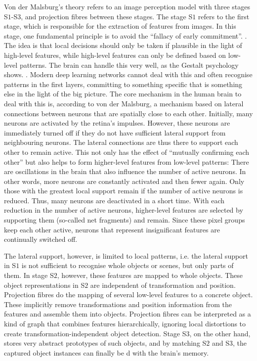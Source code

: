 Von der Malsburg's theory refers to an image perception model with three stages S$1$-S$3$, and projection fibres between these stages.
The stage S$1$ refers to the first stage, which is responsible for the extraction of features from images. In this stage, one fundamental principle is to avoid the ``fallacy of early commitment''. .
The idea is that local decisions should only be taken if plausible in the light of high-level features, while high-level features can only be defined based on low-level patterns.
The brain can handle this very well, as the Gestalt psychology shows. .
Modern deep learning networks cannot deal with this and often recognise patterns in the first layers, committing to something specific that is something else in the light of the big picture. The core mechanism in the human brain to deal with this is, according to von der Malsburg, a mechanism based on lateral connections between neurons that are spatially close to each other. Initially, many neurons are activated by the retina's impulses. However, these neurons are immediately turned off if they do not have sufficient lateral support from neighbouring neurons. The lateral connections are thus there to support each other to remain active. This not only has the effect of ``mutually confirming each other'' but also helps to form higher-level features from low-level patterns: There are oscillations in the brain that also influence the number of active neurons. In other words, more neurons are constantly activated and then fewer again. Only those with the greatest local support remain if the number of active neurons is reduced. Thus, many neurons are deactivated in a short time. With each reduction in the number of active neurons, higher-level features are selected by supporting them (so-called net fragments) and remain.
Since these pixel groups keep each other active, neurons that represent insignificant features are continually switched off.

The lateral support, however, is limited to local patterns, i.e. the lateral support in S$1$ is not sufficient to recognise whole objects or scenes, but only parts of them. In stage S$2$, however, these features are mapped to whole objects. These object representations in S$2$ are independent of transformation and position. Projection fibres do the mapping of several low-level features to a concrete object. These implicitly remove transformations and position information from the features and assemble them into objects. Projection fibres can be interpreted as a kind of graph that combines features hierarchically, ignoring local distortions to create transformation-independent object detection. Stage S$3$, on the other hand, stores very abstract prototypes of such objects, and by matching S$2$ and S$3$, the captured object instances can finally be d with the brain's memory.

